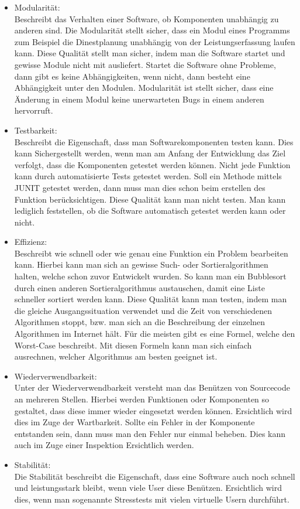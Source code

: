 \documentclass[12pt]{article}
\begin{document}
\begin{itemize}
 \item Modularität:\\
 Beschreibt das Verhalten einer Software, ob Komponenten unabhängig zu anderen sind. Die Modularität stellt sicher, dass ein Modul eines Programms zum Beispiel die Dinestplanung unabhängig von der Leistungserfassung laufen kann. Diese Qualität stellt man sicher, indem man die Software startet und gewisse Module nicht mit ausliefert. Startet die Software ohne Probleme, dann gibt es keine Abhängigkeiten, wenn nicht, dann besteht eine Abhängigkeit unter den Modulen. Modularität ist stellt sicher, dass eine Änderung in einem Modul keine unerwarteten Bugs in einem anderen hervorruft.
 \item Testbarkeit:\\
 Beschreibt die Eigenschaft, dass man Softwarekomponenten testen kann. Dies kann Sichergestellt werden, wenn man am Anfang der Entwicklung das Ziel verfolgt, dass die Komponenten getestet werden können. Nicht jede Funktion kann durch automatisierte Tests getestet werden. Soll ein Methode mittels JUNIT getestet werden, dann muss man dies schon beim erstellen des Funktion berücksichtigen. Diese Qualität kann man nicht testen. Man kann lediglich feststellen, ob die Software automatisch getestet werden kann oder nicht.
 \item Effizienz:\\
 Beschreibt wie schnell oder wie genau eine Funktion ein Problem bearbeiten kann. Hierbei kann man sich an gewisse Such- oder Sortieralgorithmen halten, welche schon zuvor Entwickelt wurden. So kann man ein Bubblesort durch einen anderen Sortieralgorithmus austauschen, damit eine Liste schneller sortiert werden kann. Diese Qualität kann man testen, indem man die gleiche Ausgangssituation verwendet und die Zeit von verschiedenen Algorithmen stoppt, bzw. man sich an die Beschreibung der einzelnen Algorithmen im Internet hält. Für die meisten gibt es eine Formel, welche den Worst-Case beschreibt. Mit diesen Formeln kann man sich einfach ausrechnen, welcher Algorithmus am besten geeignet ist.
 \item Wiederverwendbarkeit:\\
 Unter der Wiederverwendbarkeit versteht man das Benützen von Sourcecode an mehreren Stellen. Hierbei werden Funktionen oder Komponenten so gestaltet, dass diese immer wieder eingesetzt werden können. Ersichtlich wird dies im Zuge der Wartbarkeit. Sollte ein Fehler in der Komponente entstanden sein, dann muss man den Fehler nur einmal beheben. Dies kann auch im Zuge einer Inspektion Ersichtlich werden.
 \item Stabilität:\\
 Die Stabilität beschreibt die Eigenschaft, dass eine Software auch noch schnell und leistungsstark bleibt, wenn viele User diese Benützen. Ersichtlich wird dies, wenn man sogenannte Stresstests mit vielen virtuelle Usern durchführt.
\end{itemize}
\end{document}
